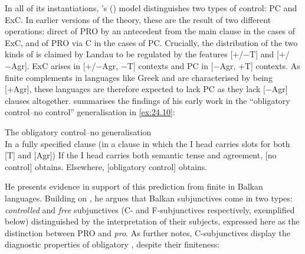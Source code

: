 \documentclass[output=paper]{langsci/langscibook}
\begin{document}
In all of its instantiations, \citeauthor{Landau2000}'s
(\citeyear{Landau2000,Landau2004,Landau2015}) model distinguishes two types of
control: \gls{PC} and
\gls{ExC}. In earlier versions of the theory,
these are the result of two different operations: direct  of PRO by an
antecedent from the main clause in the cases of \gls{ExC}, and  of PRO via C in the cases of PC. Crucially, the
distribution of the two kinds of  is claimed by Landau to be regulated
by the features [+/−T] and [+/−Agr]. \gls{ExC}
arises in [+/−Agr, −T] contexts and \gls{PC} in
[−Agr, +T] contexts. As finite complements in languages like Greek and 
are characterised by being [+Agr], these languages are therefore expected to
lack \gls{PC} as they lack [−Agr] clauses
altogether.  \citet[7]{Landau2015} summarises the findings of his early work in
the “obligatory control--no control” generalisation in \eqref{ex:24.10}:

\ea\label{ex:24.10} The obligatory control--no  generalisation\\
In a fully specified clause (in a clause in which the I head carries slots for both [T] and [Agr])
	\ea If the I head carries both semantic tense and agreement, [no control] obtains.
	\ex Elsewhere, [obligatory control] obtains.
	\z
\z

He presents evidence in support of this prediction from finite  in
Balkan languages. Building on \citet{Varlokosta1994}, he argues that Balkan
subjunctives come in two types: \emph{controlled} and \emph{free} subjunctives
(C- and F-subjunctives respectively, exemplified below) distinguished by the
interpretation of their subjects, expressed here as the distinction between PRO
and \emph{pro}. As \citet[827]{Landau2004} further notes, C-subjunctives
display the diagnostic properties of obligatory , despite their
finiteness:
\end{document}
